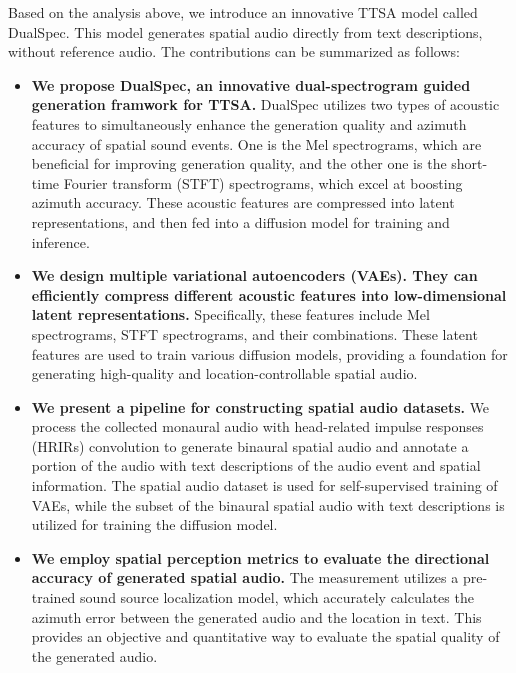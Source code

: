 \documentclass{IEEEtran}
\begin{document}
Based on the analysis above, we introduce an innovative TTSA model called DualSpec. This model generates spatial audio directly from text descriptions, without reference audio. The contributions can be summarized as follows:

\begin{itemize}
    \item
    \textbf{We propose DualSpec, an innovative dual-spectrogram guided generation framwork for TTSA.}
    {DualSpec utilizes two types of acoustic features to simultaneously enhance the generation quality and azimuth accuracy of spatial sound events. One is the Mel spectrograms, which are beneficial for improving generation quality, and the other one is the short-time Fourier transform (STFT) spectrograms, which excel at boosting azimuth accuracy. These acoustic features are compressed into latent representations, and then fed into a diffusion model for training and inference.}

    \item
\textbf{We design multiple variational autoencoders (VAEs). They can efficiently compress different acoustic features into low-dimensional latent representations.} Specifically, these features include Mel spectrograms, STFT spectrograms, and their combinations. These latent features are used to train various diffusion models, providing a foundation for generating high-quality and location-controllable spatial audio.


    \item
    {\textbf{We present a pipeline for constructing spatial audio datasets.} We process the collected monaural audio with head-related impulse responses (HRIRs) convolution to generate binaural spatial audio and annotate a portion of the audio with text descriptions of the audio event and spatial information. The spatial audio dataset is used for self-supervised training of VAEs, while the subset of the binaural spatial audio with text descriptions is utilized for training the diffusion model.}

    \item
    \textbf{We employ spatial perception metrics to evaluate the directional accuracy of generated spatial audio.} The measurement utilizes a pre-trained sound source localization model, which accurately calculates the azimuth error between the generated audio and the location in text. This provides an objective and quantitative way to evaluate the spatial quality of the generated audio.

\end{itemize}
\end{document}
